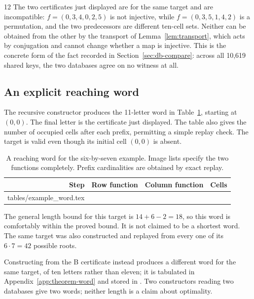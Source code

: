 \documentclass[11pt,letterpaper]{article}
\makeatletter
\numberwithin{equation}{section}
\theoremstyle{definition}
\theoremstyle{remark}
\newcommand{\dbB}{\textsf{B}}
\let\inputrows\@@input
\makeatother
\begin{document}
\begin{variantbox}{12}
The two certificates just displayed are for the same target and are
incompatible: $f=(0,3,4,0,2,5)$ is not injective, while $f=(0,3,5,1,4,2)$ is a
permutation, and the two predecessors are different ten-cell sets. Neither
can be obtained from the other by the transport of Lemma~\ref{lem:transport},
which acts by conjugation and cannot change whether a map is injective. This
is the concrete form of the fact recorded in Section~\ref{sec:db-compare}:
across all 10,619 shared keys, the two databases agree on no witness at all.
\end{variantbox}

\subsection{An explicit reaching word}
The recursive constructor produces the 11-letter word in
Table~\ref{tab:example-word}, starting at $(0,0)$. The final letter is the
certificate just displayed. The table also gives the number of occupied
cells after each prefix, permitting a simple replay check. The target is
valid even though its initial cell $(0,0)$ is absent.

\begin{table}[H]
\centering
\small
\caption{A reaching word for the six-by-seven example. Image lists specify
the two functions completely. Prefix cardinalities are obtained by exact replay.}
\label{tab:example-word}
\begin{tabular}{rccr}
\toprule
Step & Row function & Column function & Cells \\
\midrule
\inputrows tables/example_word.tex 
\bottomrule
\end{tabular}
\end{table}

The general length bound for this target is $14+6-2=18$, so this word is
comfortably within the proved bound. It is not claimed to be a shortest
word. The same target was also constructed and replayed from every one of
its $6\cdot7=42$ possible roots.

Constructing from the \dbB{} certificate instead produces a different word
for the same target, of ten letters rather than eleven; it is tabulated in
Appendix~\ref{app:theorem-word} and stored in
. Two constructors reading two
databases give two words; neither length is a claim about optimality.
\end{document}
